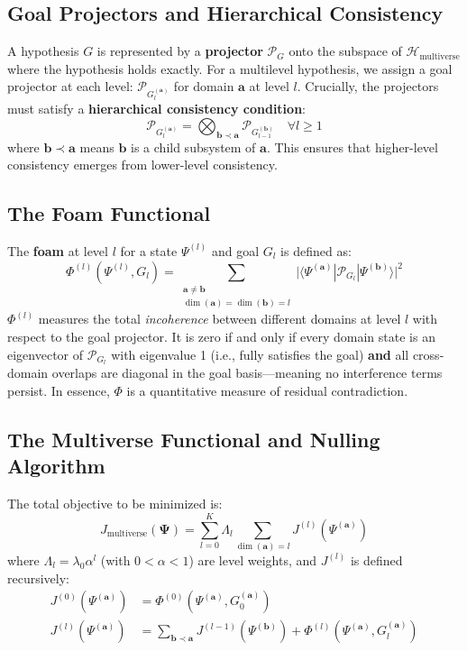 \documentclass[11pt,a4paper]{article}
\begin{document}
\subsection{Goal Projectors and Hierarchical Consistency}

A hypothesis \(G\) is represented by a \textbf{projector} \(\mathcal{P}_G\) onto the subspace of \(\mathcal{H}_{\text{multiverse}}\) where the hypothesis holds exactly. For a multilevel hypothesis, we assign a goal projector at each level: \(\mathcal{P}_{G_l^{(\mathbf{a})}}\) for domain \(\mathbf{a}\) at level \(l\). Crucially, the projectors must satisfy a \textbf{hierarchical consistency condition}:
\begin{equation}
\mathcal{P}_{G_l^{(\mathbf{a})}} = \bigotimes_{\mathbf{b} \prec \mathbf{a}} \mathcal{P}_{G_{l-1}^{(\mathbf{b})}} \quad \forall l \ge 1
\end{equation}
where \(\mathbf{b} \prec \mathbf{a}\) means \(\mathbf{b}\) is a child subsystem of \(\mathbf{a}\). This ensures that higher-level consistency emerges from lower-level consistency.

\subsection{The Foam Functional}

The \textbf{foam} at level \(l\) for a state \(\Psi^{(l)}\) and goal \(G_l\) is defined as:
\begin{equation}
\Phi^{(l)}(\Psi^{(l)}, G_l) = \sum_{\substack{\mathbf{a} \neq \mathbf{b} \\ \dim(\mathbf{a}) = \dim(\mathbf{b}) = l}} \big| \langle \Psi^{(\mathbf{a})} | \mathcal{P}_{G_l} | \Psi^{(\mathbf{b})} \rangle \big|^2
\end{equation}
\(\Phi^{(l)}\) measures the total \emph{incoherence} between different domains at level \(l\) with respect to the goal projector. It is zero if and only if every domain state is an eigenvector of \(\mathcal{P}_{G_l}\) with eigenvalue 1 (i.e., fully satisfies the goal) \textbf{and} all cross-domain overlaps are diagonal in the goal basis—meaning no interference terms persist. In essence, \(\Phi\) is a quantitative measure of residual contradiction.

\subsection{The Multiverse Functional and Nulling Algorithm}

The total objective to be minimized is:
\begin{equation}
J_{\text{multiverse}}(\mathbf{\Psi}) = \sum_{l=0}^{K} \Lambda_l \sum_{\dim(\mathbf{a}) = l} J^{(l)}(\Psi^{(\mathbf{a})})
\end{equation}
where \(\Lambda_l = \lambda_0 \alpha^l\) (with \(0<\alpha<1\)) are level weights, and \(J^{(l)}\) is defined recursively:
\begin{align}
J^{(0)}(\Psi^{(\mathbf{a})}) &= \Phi^{(0)}(\Psi^{(\mathbf{a})}, G_0^{(\mathbf{a})}) \\
J^{(l)}(\Psi^{(\mathbf{a})}) &= \sum_{\mathbf{b} \prec \mathbf{a}} J^{(l-1)}(\Psi^{(\mathbf{b})}) + \Phi^{(l)}(\Psi^{(\mathbf{a})}, G_l^{(\mathbf{a})})
\end{align}
\end{document}
